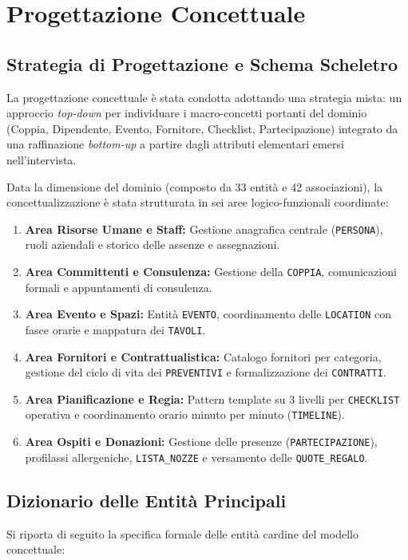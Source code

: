 \chapter{Progettazione Concettuale}

\section{Strategia di Progettazione e Schema Scheletro}
La progettazione concettuale è stata condotta adottando una strategia mista: un approccio \textit{top-down} per individuare i macro-concetti portanti del dominio (Coppia, Dipendente, Evento, Fornitore, Checklist, Partecipazione) integrato da una raffinazione \textit{bottom-up} a partire dagli attributi elementari emersi nell'intervista.

Data la dimensione del dominio (composto da 33 entità e 42 associazioni), la concettualizzazione è stata strutturata in sei aree logico-funzionali coordinate:

\begin{enumerate}
    \item \textbf{Area Risorse Umane e Staff:} Gestione anagrafica centrale (\texttt{PERSONA}), ruoli aziendali e storico delle assenze e assegnazioni.
    \item \textbf{Area Committenti e Consulenza:} Gestione della \texttt{COPPIA}, comunicazioni formali e appuntamenti di consulenza.
    \item \textbf{Area Evento e Spazi:} Entità \texttt{EVENTO}, coordinamento delle \texttt{LOCATION} con fasce orarie e mappatura dei \texttt{TAVOLI}.
    \item \textbf{Area Fornitori e Contrattualistica:} Catalogo fornitori per categoria, gestione del ciclo di vita dei \texttt{PREVENTIVI} e formalizzazione dei \texttt{CONTRATTI}.
    \item \textbf{Area Pianificazione e Regia:} Pattern template su 3 livelli per \texttt{CHECKLIST} operativa e coordinamento orario minuto per minuto (\texttt{TIMELINE}).
    \item \textbf{Area Ospiti e Donazioni:} Gestione delle presenze (\texttt{PARTECIPAZIONE}), profilassi allergeniche, \texttt{LISTA\_NOZZE} e versamento delle \texttt{QUOTE\_REGALO}.
\end{enumerate}

\section{Dizionario delle Entità Principali}
Si riporta di seguito la specifica formale delle entità cardine del modello concettuale:

